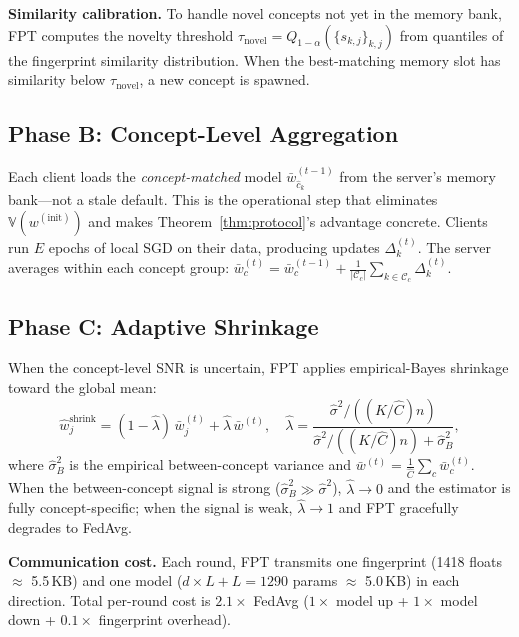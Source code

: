 \documentclass[11pt]{article}
\newcommand{\V}{\mathbb{V}}
\newcommand{\cC}{\mathcal{C}}
\newcommand{\what}{\hat{w}}
\newcommand{\wbar}{\bar{w}}
\begin{document}
\textbf{Similarity calibration.}
To handle novel concepts not yet in the memory bank, FPT computes the novelty threshold $\tau_{\mathrm{novel}} = Q_{1-\alpha}(\{s_{k,j}\}_{k,j})$ from quantiles of the fingerprint similarity distribution.
When the best-matching memory slot has similarity below $\tau_{\mathrm{novel}}$, a new concept is spawned.

\subsection{Phase B: Concept-Level Aggregation}

Each client loads the \emph{concept-matched} model $\wbar_{\hat c_k}^{(t-1)}$ from the server's memory bank---not a stale default.
This is the operational step that eliminates $\V(w^{(\mathrm{init})})$ and makes Theorem~\ref{thm:protocol}'s advantage concrete.
Clients run $E$ epochs of local SGD on their data, producing updates $\Delta_k^{(t)}$.
The server averages within each concept group:
$\wbar_c^{(t)} = \wbar_c^{(t-1)} + \frac{1}{|\cC_c|}\sum_{k \in \cC_c} \Delta_k^{(t)}$.

\subsection{Phase C: Adaptive Shrinkage}

When the concept-level SNR is uncertain, FPT applies empirical-Bayes shrinkage toward the global mean:
\begin{equation}
\what_j^{\mathrm{shrink}} = (1 - \hat\lambda)\,\wbar_j^{(t)} + \hat\lambda\,\wbar^{(t)},
\quad
\hat\lambda = \frac{\hat\sigma^2 / ((K/\hat C)n)}{\hat\sigma^2 / ((K/\hat C)n) + \hat\sigma_B^2},
\end{equation}
where $\hat\sigma_B^2$ is the empirical between-concept variance and $\wbar^{(t)} = \frac{1}{\hat C}\sum_c \wbar_c^{(t)}$.
When the between-concept signal is strong ($\hat\sigma_B^2 \gg \hat\sigma^2$), $\hat\lambda \to 0$ and the estimator is fully concept-specific; when the signal is weak, $\hat\lambda \to 1$ and FPT gracefully degrades to FedAvg.

\textbf{Communication cost.}
Each round, FPT transmits one fingerprint (1418 floats $\approx$ 5.5\,KB) and one model ($d \times L + L = 1290$ params $\approx$ 5.0\,KB) in each direction.
Total per-round cost is $2.1\times$ FedAvg ($1\times$ model up + $1\times$ model down + $0.1\times$ fingerprint overhead).
\end{document}
